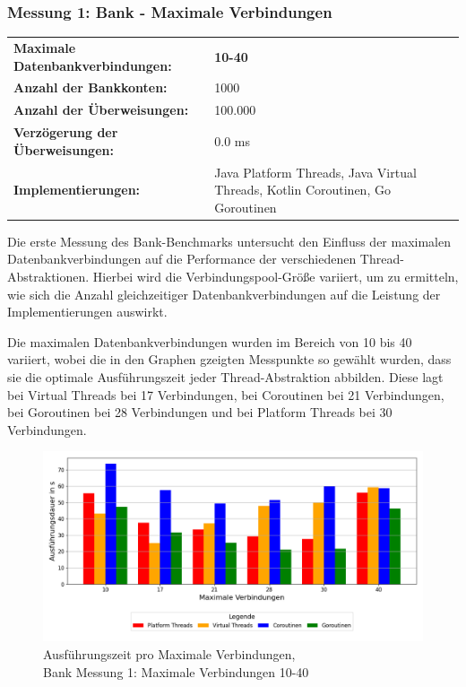 \documentclass[fontsize=12pt,paper=a4,twoside=semi,parskip=half-,headsepline,headinclude]{scrreprt}
\begin{document}
\subsubsection{Messung 1: Bank - Maximale Verbindungen}

\begin{tabularx}{\textwidth}{@{}lX@{}}
	\textbf{Maximale Datenbankverbindungen:} & \textbf{10-40} \\
	\textbf{Anzahl der Bankkonten:} & 1000 \\
	\textbf{Anzahl der Überweisungen:} & 100.000 \\
	\textbf{Verzögerung der Überweisungen:} & 0.0 ms \\
	\textbf{Implementierungen:} & Java Platform Threads, Java Virtual Threads, Kotlin Coroutinen, Go Goroutinen
\end{tabularx}

Die erste Messung des Bank-Benchmarks untersucht den Einfluss der maximalen Datenbankverbindungen auf die Performance der verschiedenen Thread-Abstraktionen. Hierbei wird die Verbindungspool-Größe variiert, um zu ermitteln, wie sich die Anzahl gleichzeitiger Datenbankverbindungen auf die Leistung der Implementierungen auswirkt.

Die maximalen Datenbankverbindungen wurden im Bereich von 10 bis 40 variiert, wobei die in den Graphen gzeigten Messpunkte so gewählt wurden, dass sie die optimale Ausführungszeit jeder Thread-Abstraktion abbilden. Diese lagt bei Virtual Threads bei 17 Verbindungen, bei Coroutinen bei 21 Verbindungen, bei Goroutinen bei 28 Verbindungen und bei Platform Threads bei 30 Verbindungen.

\begin{figure}[H]
	\centering
	\includegraphics[scale=0.5]{figures/bank/connections10-40/execution_time_plot.png}
	\caption{Ausführungszeit pro Maximale Verbindungen,\\ Bank Messung 1: Maximale Verbindungen 10-40}
	\label{fig:bankConnZeit}
\end{figure}
\end{document}

